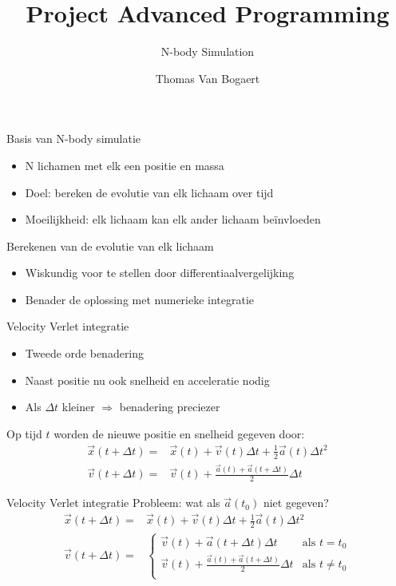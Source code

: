 \documentclass{beamer}
\title{Project Advanced Programming}
\subtitle{N-body Simulation}
\author{Thomas Van Bogaert}
\date{}
\begin{document}
	
	\frame{\titlepage}
	
	\begin{frame}{Basis van N-body simulatie}
		\note{}
		\begin{itemize}
			\item N lichamen met elk een positie en massa
			\item Doel: bereken de evolutie van elk lichaam over tijd
			\item Moeilijkheid: elk lichaam kan elk ander lichaam be\"invloeden
		\end{itemize}
	\end{frame}
	\begin{frame}{Berekenen van de evolutie van elk lichaam}
		\note{}
		\begin{itemize}
			\item Wiskundig voor te stellen door differentiaalvergelijking
			\item Benader de oplossing met numerieke integratie
		\end{itemize}
	\end{frame}
	\begin{frame}{Velocity Verlet integratie}
		\begin{itemize}
			\item Tweede orde benadering
			\item Naast positie nu ook snelheid en acceleratie nodig
			\item Als $\Delta t$ kleiner $\Rightarrow$ benadering preciezer
		\end{itemize}
		Op tijd $t$ worden de nieuwe positie en snelheid gegeven door:
		\begin{align*}
		\vec{x}(t + \Delta t) =& \vec{x}(t) + \vec{v}(t) \Delta t + \frac{1}{2} \vec{a}(t) \Delta t^2  \\
		\vec{v}(t + \Delta t) =& \vec{v}(t) + \frac{\vec{a}(t) + \vec{a}(t + \Delta t)}{2} \Delta t
		\end{align*}
	\end{frame}
	\begin{frame}{Velocity Verlet integratie}
		Probleem: wat als $\vec{a}(t_0)$ niet gegeven?
		\begin{align*}
		\vec{x}(t + \Delta t) =& 
		\vec{x}(t) + \vec{v}(t) \Delta t + \frac{1}{2} \vec{a}(t) \Delta t^2 \\
		\vec{v}(t + \Delta t) =& \begin{cases}
		\vec{v}(t) + \vec{a}(t + \Delta t) \Delta t    &\text{als } t = t_0 \\
		\vec{v}(t) + \frac{\vec{a}(t) + \vec{a}(t + \Delta t)}{2} \Delta t     &\text{als } t \neq t_0 \\
		\end{cases}
		\end{align*}
	\end{frame}
		
\end{document}

